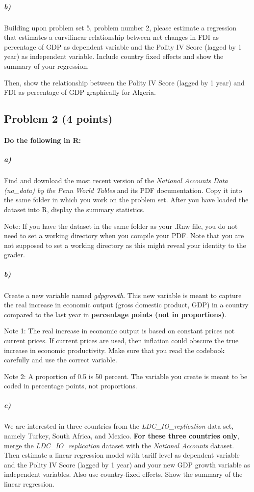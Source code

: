 \documentclass[12pt]{article}
\begin{document}
\subparagraph{b)} Building upon problem set 5, problem number 2, please estimate a regression that estimates a curvilinear relationship between net changes in FDI as percentage of GDP as dependent variable and the Polity IV Score (lagged by 1 year) as independent variable. Include country fixed effects and show the summary of your regression.

Then, show the relationship between the Polity IV Score (lagged by 1 year) and FDI as percentage of GDP graphically for Algeria.



\subsection*{Problem 2 (4 points)}

\paragraph{Do the following in R:}

\subparagraph{a)} Find and download the most recent version of the \textit{National Accounts Data (na\_data) by the Penn World Tables} and its PDF documentation. Copy it into the same folder in which you work on the problem set. After you have loaded the dataset into R, display the summary statistics.

Note: If you have the dataset in the same folder as your .Rnw file, you do not need to set a working directory when you compile your PDF. Note that you are not supposed to set a working directory as this might reveal your identity to the grader.

\subparagraph{b)} Create a new variable named \textit{gdpgrowth}. This new variable is meant to capture the real increase in economic output (gross domestic product, GDP) in a country compared to the last year in \textbf{percentage points (not in proportions)}.

Note 1: The real increase in economic output is based on constant prices not current prices. If current prices are used, then inflation could obscure the true increase in economic productivity. Make sure that you read the codebook carefully and use the correct variable.

Note 2: A proportion of 0.5 is 50 percent. The variable you create is meant to be coded in percentage points, not proportions.

\subparagraph{c)} We are interested in three countries from the \textit{LDC\_IO\_replication} data set, namely Turkey, South Africa, and Mexico. \textbf{For these three countries only}, merge the \textit{LDC\_IO\_replication} dataset with the \textit{National Accounts} dataset. Then estimate a linear regression model with tariff level as dependent variable and the Polity IV Score (lagged by 1 year) and your new GDP growth variable as independent variables. Also use country-fixed effects. Show the summary of the linear regression.
\end{document}
